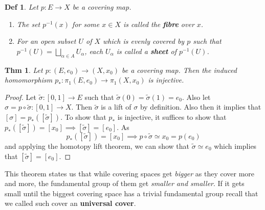 \documentclass[paper=a4, fontsize=11pt]{scrartcl}
\newtheorem{theorem}{Thm}
\newtheorem{definition}{Def}
\begin{document}
\vspace{0.15in}

\begin{definition}
	Let $p:E\to X $ be a covering map.
	\begin{enumerate}
		\item The set $p^{-1}(x)$ for some $x\in X$ is called the \textbf{fibre} over $x$.
		\item For an open subset $U$ of $X$ which is evenly covered by $p$ such that $p^{-1}(U)=\bigsqcup\limits_{\alpha \in A} U_\alpha$, each $U_\alpha$ is called a \textbf{sheet} of $p^{-1}(U)$.
	\end{enumerate}
\end{definition}

\vspace{0.15in}


\begin{theorem}
Let $p:(E,e_0) \to (X,x_0)$ be a covering map. Then the induced homomorphism $p_\ast : \pi_1(E,e_0) \to \pi_1(X,x_0)$ is injective.\\
\end{theorem}

\begin{proof}
	Let $\tilde{\sigma} :[0,1] \to E$ such that $\tilde{\sigma}(0)=\tilde{\sigma}(1)=e_0$. Also let $\sigma = p \circ \tilde{\sigma} : [0,1] \to X$. Then $\tilde{\sigma}$ is a lift of $\sigma$ by definition. Also then it implies that $[\sigma]=p_\ast ([\tilde{\sigma}])$. To show that $p_\ast$ is injective, it suffices to show that $p_\ast([\tilde{\sigma}])=[x_0] \implies [\tilde{\sigma}]=[e_0]$. As 
	\begin{equation} \nonumber
		p_\ast([\tilde{\sigma}])=[x_0] \implies p \circ \tilde{\sigma} \simeq x_0 = p(e_0)
	\end{equation}
	and applying the homotopy lift theorem, we can show that $\tilde{\sigma} \simeq e_0$ which implies that $[\tilde{\sigma}]=[e_0]$.
\end{proof}

This theorem states us that while covering spaces get \textit{bigger} as they cover more and more, the fundamental group of them get \textit{smaller and smaller}. If it gets small until the biggest covering space has a trivial fundamental group recall that we called such cover an \textbf{universal cover}.

\vspace{0.15in}
\end{document}

